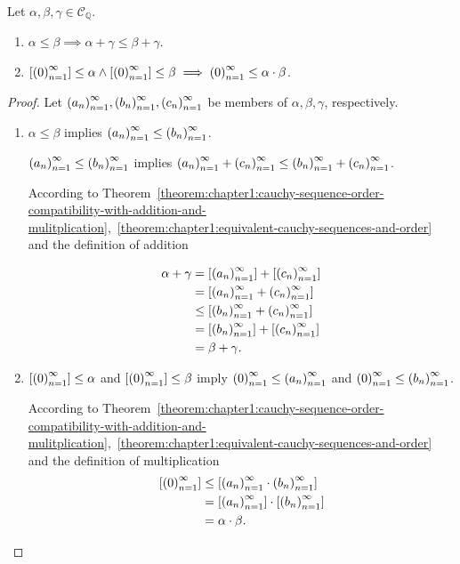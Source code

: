 \begin{theorem}
    Let $\alpha, \beta, \gamma\in\mathscr{C}_{\mathbb{Q}}$.
    \begin{enumerate}[label={(\roman*)}]
        \item $\alpha\le\beta\implies\alpha+\gamma\le\beta+\gamma$.
        \item $\left[{{\left({0}\right)}^{\infty}_{n=1}}\right]\le\alpha\land\left[{{\left({0}\right)}^{\infty}_{n=1}}\right]\le\beta\implies{\left({0}\right)}^{\infty}_{n=1}\le\alpha\cdot\beta$.
    \end{enumerate}
\end{theorem}

\begin{proof}
    Let ${\left({a_{n}}\right)}^{\infty}_{n=1}, {\left({b_{n}}\right)}^{\infty}_{n=1}, {\left({c_{n}}\right)}^{\infty}_{n=1}$ be members of $\alpha, \beta, \gamma$, respectively.
    \begin{enumerate}[label={(\roman*)}]
        \item $\alpha\le\beta$ implies ${\left({a_{n}}\right)}^{\infty}_{n=1}\le{\left({b_{n}}\right)}^{\infty}_{n=1}$.

              ${\left({a_{n}}\right)}^{\infty}_{n=1}\le{\left({b_{n}}\right)}^{\infty}_{n=1}$ implies ${\left({a_{n}}\right)}^{\infty}_{n=1} + {\left({c_{n}}\right)}^{\infty}_{n=1}\le{\left({b_{n}}\right)}^{\infty}_{n=1} + {\left({c_{n}}\right)}^{\infty}_{n=1}$.

              According to Theorem~\ref{theorem:chapter1:cauchy-sequence-order-compatibility-with-addition-and-mulitplication},~\ref{theorem:chapter1:equivalent-cauchy-sequences-and-order} and the definition of addition

              \begin{align*}
                  \alpha + \gamma & = \left[{{\left({a_{n}}\right)}^{\infty}_{n=1}}\right] + \left[{{\left({c_{n}}\right)}^{\infty}_{n=1}}\right] \\
                                  & = \left[{{\left({a_{n}}\right)}^{\infty}_{n=1} + {\left({c_{n}}\right)}^{\infty}_{n=1}}\right]         \\
                                  & \le\left[{{\left({b_{n}}\right)}^{\infty}_{n=1} + {\left({c_{n}}\right)}^{\infty}_{n=1}}\right]        \\
                                  & = \left[{{\left({b_{n}}\right)}^{\infty}_{n=1}}\right] + \left[{{\left({c_{n}}\right)}^{\infty}_{n=1}}\right] \\
                                  & = \beta + \gamma.
              \end{align*}
        \item $\left[{{\left({0}\right)}^{\infty}_{n=1}}\right]\le\alpha$ and $\left[{{\left({0}\right)}^{\infty}_{n=1}}\right]\le\beta$ imply ${\left({0}\right)}^{\infty}_{n=1}\le{\left({a_{n}}\right)}^{\infty}_{n=1}$ and ${\left({0}\right)}^{\infty}_{n=1}\le{\left({b_{n}}\right)}^{\infty}_{n=1}$.

              According to Theorem~\ref{theorem:chapter1:cauchy-sequence-order-compatibility-with-addition-and-mulitplication},~\ref{theorem:chapter1:equivalent-cauchy-sequences-and-order} and the definition of multiplication
              \begin{align*}
                  \left[{{\left({0}\right)}^{\infty}_{n=1}}\right] & \le \left[{{\left({a_{n}}\right)}^{\infty}_{n=1}\cdot{\left({b_{n}}\right)}^{\infty}_{n=1}}\right]       \\
                                  & = \left[{{\left({a_{n}}\right)}^{\infty}_{n=1}}\right]\cdot\left[{{\left({b_{n}}\right)}^{\infty}_{n=1}}\right] \\
                                  & = \alpha\cdot\beta.\qedhere
              \end{align*}
    \end{enumerate}
\end{proof}

